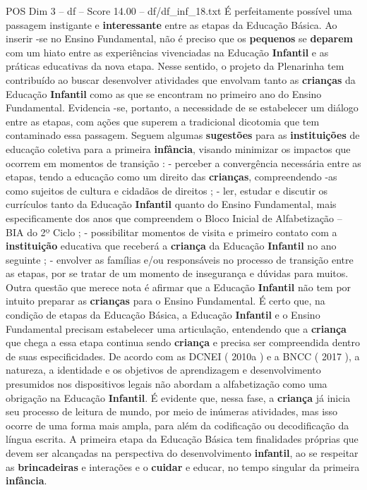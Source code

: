 \begin{textsample}{POS Dim 3 – df – Score 14.00 – df/df\_inf\_18.txt}
É perfeitamente possível uma passagem instigante e \textbf{interessante} entre as etapas da Educação Básica.
Ao inserir -se no Ensino Fundamental, não é preciso que os \textbf{pequenos} se \textbf{deparem} com um hiato entre as experiências vivenciadas na Educação \textbf{Infantil} e as práticas educativas da nova etapa.
Nesse sentido, o projeto da Plenarinha tem contribuído ao buscar desenvolver atividades que envolvam tanto as \textbf{crianças} da Educação \textbf{Infantil} como as que se encontram no primeiro ano do Ensino Fundamental.
Evidencia -se, portanto, a necessidade de se estabelecer um diálogo entre as etapas, com ações que superem a tradicional dicotomia que tem contaminado essa passagem.
Seguem algumas \textbf{sugestões} para as \textbf{instituições} de educação coletiva para a primeira \textbf{infância}, visando minimizar os impactos que ocorrem em momentos de transição : - perceber a convergência necessária entre as etapas, tendo a educação como um direito das \textbf{crianças}, compreendendo -as como sujeitos de cultura e cidadãos de direitos ; - ler, estudar e discutir os currículos tanto da Educação \textbf{Infantil} quanto do Ensino Fundamental, mais especificamente dos anos que compreendem o Bloco Inicial de Alfabetização – BIA do 2º Ciclo ; - possibilitar momentos de visita e primeiro contato com a \textbf{instituição} educativa que receberá a \textbf{criança} da Educação \textbf{Infantil} no ano seguinte ; - envolver as famílias e/ou responsáveis no processo de transição entre as etapas, por se tratar de um momento de insegurança e dúvidas para muitos.
Outra questão que merece nota é afirmar que a Educação \textbf{Infantil} não tem por intuito preparar as \textbf{crianças} para o Ensino Fundamental.
É certo que, na condição de etapas da Educação Básica, a Educação \textbf{Infantil} e o Ensino Fundamental precisam estabelecer uma articulação, entendendo que a \textbf{criança} que chega a essa etapa continua sendo \textbf{criança} e precisa ser compreendida dentro de suas especificidades.
De acordo com as DCNEI ( 2010a ) e a BNCC ( 2017 ), a natureza, a identidade e os objetivos de aprendizagem e desenvolvimento presumidos nos dispositivos legais não abordam a alfabetização como uma obrigação na Educação \textbf{Infantil}.
É evidente que, nessa fase, a \textbf{criança} já inicia seu processo de leitura de mundo, por meio de inúmeras atividades, mas isso ocorre de uma forma mais ampla, para além da codificação ou decodificação da língua escrita.
A primeira etapa da Educação Básica tem finalidades próprias que devem ser alcançadas na perspectiva do desenvolvimento \textbf{infantil}, ao se respeitar as \textbf{brincadeiras} e interações e o \textbf{cuidar} e educar, no tempo singular da primeira \textbf{infância}.

\end{textsample}
